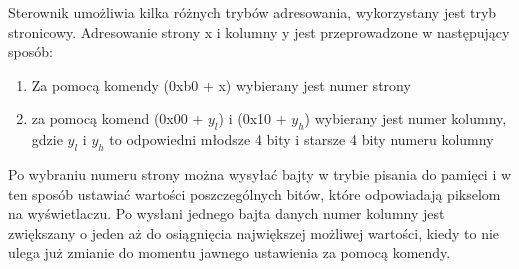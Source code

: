 Sterownik umożliwia kilka różnych trybów adresowania, wykorzystany jest tryb stronicowy. Adresowanie strony x i kolumny y jest przeprowadzone w następujący sposób:
\begin{enumerate}
    \item Za pomocą komendy (0xb0 + x) wybierany jest numer strony
    \item za pomocą komend (0x00 + $y_l$) i (0x10 + $y_h$) wybierany jest numer kolumny, gdzie $y_l$ i $y_h$ to odpowiedni młodsze 4 bity i starsze 4 bity numeru kolumny
\end{enumerate}

Po wybraniu numeru strony można wysyłać bajty w trybie pisania do pamięci i w ten sposób ustawiać wartości poszczególnych bitów, które odpowiadają pikselom na wyświetlaczu. Po wysłani jednego bajta danych numer kolumny jest zwiększany o jeden aż do osiągnięcia największej możliwej wartości, kiedy to nie ulega już zmianie do momentu jawnego ustawienia za pomocą komendy.
